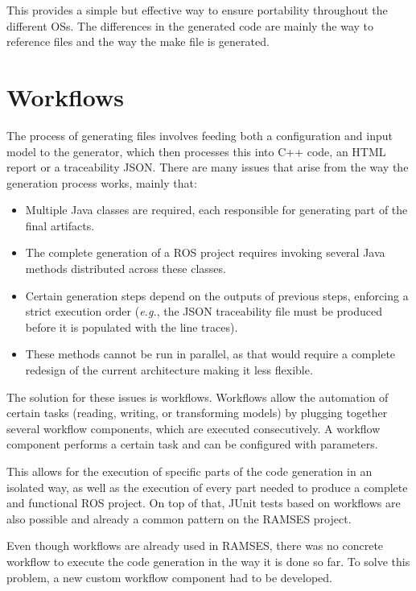 This provides a simple but effective way to ensure portability throughout the different \glspl{OS}.
The differences in the generated code are mainly the way to reference files and the way the make file is generated. 






\section{Workflows}
\label{sec:workflows}

The process of generating files involves feeding both a configuration and input model to the generator, which then processes this into C++ code, an \gls{HTML} report or a traceability \gls{JSON}. There are many issues that arise from the way the generation process works, mainly that:

\begin{itemize} 
	\item Multiple Java classes are required, each responsible for generating part of the final artifacts.
	\item The complete generation of a \gls{ROS} project requires invoking several Java methods distributed across these classes.
	\item Certain generation steps depend on the outputs of previous steps, enforcing a strict execution order (\textit{e.g.}, the \gls{JSON} traceability file must be produced before it is populated with the line traces).
	\item These methods cannot be run in parallel, as that would require a complete redesign of the current architecture making it less flexible.
\end{itemize}


The solution for these issues is workflows. Workflows allow the automation of certain tasks (reading, writing, or transforming models) by plugging together several workflow components, which are executed consecutively. A workflow component performs a certain task and can be configured with parameters.

This allows for the execution of specific parts of the code generation in an isolated way, as well as the execution of every part needed to produce a complete and functional \gls{ROS} project. On top of that, \gls{JUnit} tests based on workflows are also possible and already a common pattern on the \gls{RAMSES} project.

Even though workflows are already used in \gls{RAMSES}, there was no concrete workflow to execute the code generation in the way it is done so far. To solve this problem, a new custom workflow component had to be developed.

